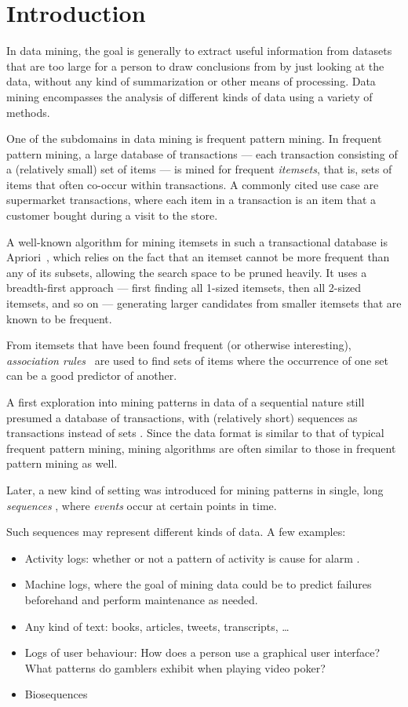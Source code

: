 \chapter{Introduction}

In data mining, the goal is generally to extract useful information from datasets that are too large for a person to draw conclusions from by just looking at the data, without any kind of summarization or other means of processing. Data mining encompasses the analysis of different kinds of data using a variety of methods.

One of the subdomains in data mining is frequent pattern mining. In frequent pattern mining, a large database of transactions --- each transaction consisting of a (relatively small) set of items --- is mined for frequent \emph{itemsets}, that is, sets of items that often co-occur within transactions. A commonly cited use case are supermarket transactions, where each item in a transaction is an item that a customer bought during a visit to the store.

A well-known algorithm for mining itemsets in such a transactional database is Apriori~\citep{agrawal1994fast}, which relies on the fact that an itemset cannot be more frequent than any of its subsets, allowing the search space to be pruned heavily. It uses a breadth-first approach --- first finding all 1-sized itemsets, then all 2-sized itemsets, and so on --- generating larger candidates from smaller itemsets that are known to be frequent.

From itemsets that have been found frequent (or otherwise interesting), \emph{association rules}~\cite{agrawal1994fast} are used to find sets of items where the occurrence of one set can be a good predictor of another.

A first exploration into mining patterns in data of a sequential nature still presumed a database of transactions, with (relatively short) sequences as transactions instead of sets \citep{agrawal1995mining}.
Since the data format is similar to that of typical frequent pattern mining, mining algorithms are often similar to those in frequent pattern mining as well.

Later, a new kind of setting was introduced for mining patterns in single, long \emph{sequences} \citep{mannila1997discovery}, where \emph{events} occur at certain points in time.

Such sequences may represent different kinds of data. A few examples:
\begin{itemize}
\item Activity logs: whether or not a pattern of activity is cause for alarm \cite{mannila1997discovery}.
\item Machine logs, where the goal of mining data could be to predict failures beforehand and perform maintenance as needed.
\item Any kind of text: books, articles, tweets, transcripts, \ldots
\item Logs of user behaviour: How does a person use a graphical user interface? What patterns do gamblers exhibit when playing video poker?
\item Biosequences \cite{biosequences}
\end{itemize}

